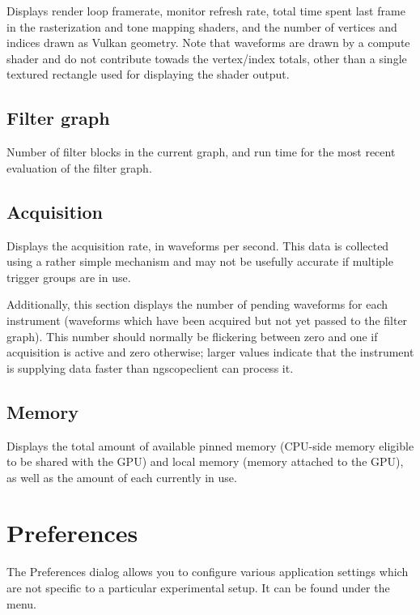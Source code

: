 Displays render loop framerate, monitor refresh rate, total time spent last frame in the rasterization and tone
mapping shaders, and the number of vertices and indices drawn as Vulkan geometry. Note that waveforms are drawn by a
compute shader and do not contribute towads the vertex/index totals, other than a single textured rectangle used for
displaying the shader output.

\subsection{Filter graph}
Number of filter blocks in the current graph, and run time for the most recent evaluation of the
filter graph.

\subsection{Acquisition}

Displays the acquisition rate, in waveforms per second. This data is collected using a rather simple mechanism and
may not be usefully accurate if multiple trigger groups are in use.

Additionally, this section displays the number of pending waveforms for each instrument (waveforms which have been
acquired but not yet passed to the filter graph). This number should normally be flickering between zero and one if
acquisition is active and zero otherwise; larger values indicate that the instrument is supplying data faster than
ngscopeclient can process it.

\subsection{Memory}

Displays the total amount of available pinned memory (CPU-side memory eligible to be shared with the GPU) and local
memory (memory attached to the GPU), as well as the amount of each currently in use.


\section{Preferences}
\label{dlg:preferences}

The Preferences dialog allows you to configure various application settings which are not specific to a particular
experimental setup. It can be found under the  menu.

